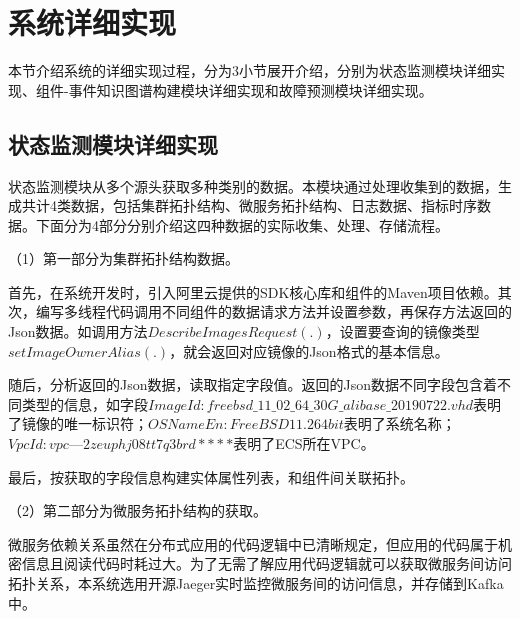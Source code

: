 \section{系统详细实现}
本节介绍系统的详细实现过程，分为3小节展开介绍，分别为状态监测模块详细实现、组件-事件知识图谱构建模块详细实现和故障预测模块详细实现。

\subsection{状态监测模块详细实现}\label{data-collect-way}
状态监测模块从多个源头获取多种类别的数据。本模块通过处理收集到的数据，生成共计4类数据，包括集群拓扑结构、微服务拓扑结构、日志数据、指标时序数据。下面分为4部分分别介绍这四种数据的实际收集、处理、存储流程。
    
    （1）第一部分为集群拓扑结构数据。
    
    首先，在系统开发时，引入阿里云提供的SDK核心库和组件的Maven项目依赖。其次，编写多线程代码调用不同组件的数据请求方法并设置参数，再保存方法返回的Json数据。如调用方法$DescribeImagesRequest(.)$，设置要查询的镜像类型$setImageOwnerAlias(.)$，就会返回对应镜像的Json格式的基本信息。
    
    随后，分析返回的Json数据，读取指定字段值。返回的Json数据不同字段包含着不同类型的信息，如字段$ ImageId: freebsd\_11\_02\_64\_30G\_alibase\_20190722.vhd$表明了镜像的唯一标识符；$OSNameEn: FreeBSD  11.2 64 bit$表明了系统名称；$VpcId:vpc—2zeuphj08tt7q3brd****$表明了ECS所在VPC。
    
    最后，按获取的字段信息构建实体属性列表，和组件间关联拓扑。

    \newpage
    （2）第二部分为微服务拓扑结构的获取。
    
    微服务依赖关系虽然在分布式应用的代码逻辑中已清晰规定，但应用的代码属于机密信息且阅读代码时耗过大。为了无需了解应用代码逻辑就可以获取微服务间访问拓扑关系，本系统选用开源Jaeger实时监控微服务间的访问信息，并存储到Kafka中。
    
